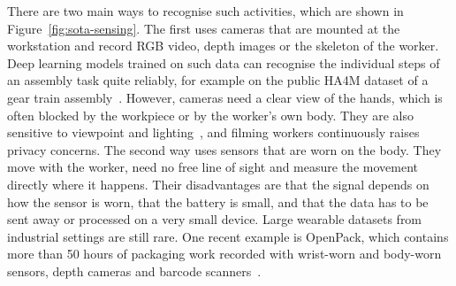 There are two main ways to recognise such activities, which are shown in
Figure~\ref{fig:sota-sensing}. The first uses cameras that are mounted at the
workstation and record RGB video, depth images or the skeleton of the worker. Deep learning models trained on such data can recognise
the individual steps of an assembly task quite reliably, for example on the
public HA4M dataset of a gear train assembly~\cite{matin2024hybrid,
bonyani2026multimodal}. However, cameras need a clear view of the hands, which
is often blocked by the workpiece or by the worker's own body. They are also
sensitive to viewpoint and lighting~\cite{alamin2019action}, and filming
workers continuously raises privacy concerns. The second way uses sensors that are worn
on the body. They move with the worker, need no free line of sight and measure
the movement directly where it happens. Their disadvantages are that the signal
depends on how the sensor is worn, that the battery is small, and that the data
has to be sent away or processed on a very small device. Large wearable
datasets from industrial settings are still rare. One recent example is
OpenPack, which contains more than 50 hours of packaging work recorded with
wrist-worn and body-worn sensors, depth cameras and barcode
scanners~\cite{yoshimura2024openpack}.

